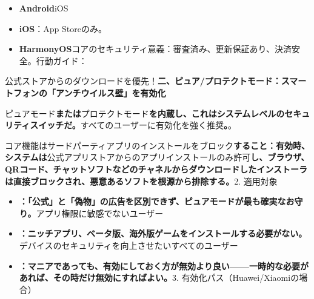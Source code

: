 


\begin{itemize}
  \item \textbf{Android}iOS
  \item \textbf{iOS}：App Storeのみ。
  \item \textbf{HarmonyOS}コアのセキュリティ意義：審査済み、更新保証あり、決済安全。行動ガイド：
\end{itemize}

公式ストアからのダウンロードを優先！\textbf{二、ピュア/プロテクトモード：スマートフォンの「アンチウイルス壁」を有効化}


ピュアモード\textbf{または}プロテクトモード\textbf{を内蔵し、これはシステムレベルのセキュリティスイッチだ。}すべてのユーザーに有効化を強く推奨\textbf{。}。


コア機能はサードパーティアプリのインストールをブロック\textbf{すること：有効時、システムは}公式アプリストアからのアプリインストールのみ許可\textbf{し、ブラウザ、QRコード、チャットソフトなどのチャネルからダウンロードしたインストーラは直接ブロックされ、悪意あるソフトを根源から排除する。}2. 適用対象


\begin{itemize}
  \item \textbf{：「公式」と「偽物」の広告を区別できず、ピュアモードが最も確実なお守り。}アプリ権限に敏感でないユーザー
  \item \textbf{：ニッチアプリ、ベータ版、海外版ゲームをインストールする必要がない。}デバイスのセキュリティを向上させたいすべてのユーザー
  \item \textbf{：マニアであっても、有効にしておく方が無効より良い——一時的な必要があれば、その時だけ無効にすればよい。}3. 有効化パス（Huawei/Xiaomiの場合）
\end{itemize}


